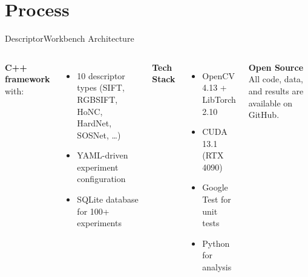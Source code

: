 \documentclass[aspectratio=169, 12pt]{beamer}
\begin{document}
\section{Process}

\begin{frame}{DescriptorWorkbench Architecture}
  \begin{columns}[T]
    \textbf{C++ framework} with:
    \begin{itemize}
      \item 10 descriptor types (SIFT, RGBSIFT, HoNC, HardNet, SOSNet, \ldots)
      \item YAML-driven experiment configuration
      \item SQLite database for 100+ experiments
    \end{itemize}
    \textbf{Tech Stack}
      \begin{itemize}
        \item OpenCV 4.13 + LibTorch 2.10
        \item CUDA 13.1 (RTX 4090)
        \item Google Test for unit tests
        \item Python for analysis
      \end{itemize}
    \vspace{0.5em}
    \textbf{Open Source}
      All code, data, and results are available on GitHub.
  \end{columns}
\end{frame}
\end{document}
